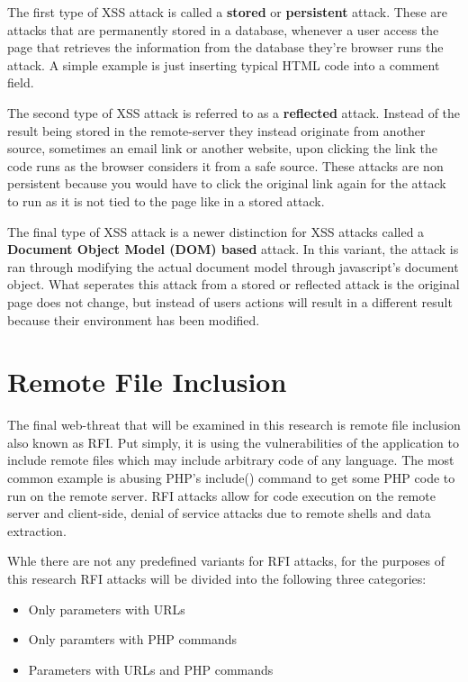 The first type of XSS attack is called a \textbf{stored} or \textbf{persistent} attack.  These are attacks that are permanently stored in a database, whenever a user access the page that retrieves the information from the database they're browser runs the attack. A simple example is just inserting typical HTML code into a comment field.

The second type of XSS attack is referred to as a \textbf{reflected} attack.  Instead of the result being stored in the remote-server they instead originate from another source, sometimes an email link or another website, upon clicking the link the code runs as the browser considers it from a safe source.  These attacks are non persistent because you would have to click the original link again for the attack to run as it is not tied to the page like in a stored attack.

The final type of XSS attack is a newer distinction for XSS attacks called a \textbf{Document Object Model (DOM) based} attack.  In this variant, the attack is ran through modifying the actual document model through javascript's document object.  What seperates this attack from a stored or reflected attack is the original page does not change, but instead of users actions will result in a different result because their environment has been modified.

\section{Remote File Inclusion}

The final web-threat that will be examined in this research is remote file inclusion also known as RFI.  Put simply, it is using the vulnerabilities of the application to include remote files which may include arbitrary code of any language.  The most common example is abusing PHP's include() command to get some PHP code to run on the remote server.  RFI attacks allow for code execution on the remote server and client-side, denial of service attacks due to remote shells and data extraction.

Whle there are not any predefined variants for RFI attacks, for the purposes of this research RFI attacks will be divided into the following three categories:

\begin{itemize}
	\item Only parameters with URLs
	\item Only paramters with PHP commands
	\item Parameters with URLs and PHP commands
\end{itemize}
